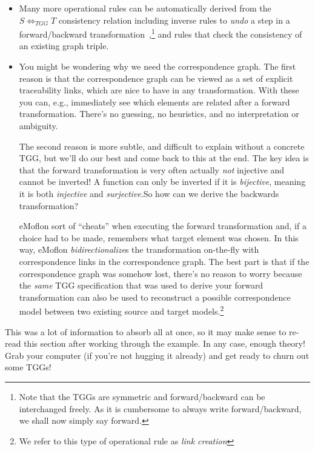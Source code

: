 \begin{itemize}

\item Many more operational rules can be automatically derived from the $S \Leftrightarrow_{TGG} T$ consistency relation including inverse rules to \emph{undo}
a step in a forward/backward transformation~\cite{LAVS_ICGT_2012},\footnote{Note that the TGGs are symmetric and forward/backward can be interchanged freely.
As it is cumbersome to always write forward/backward, we shall now simply say forward.} and rules that check the consistency of an existing graph triple.

\item You might be wondering why we need the correspondence graph. The first reason is that the correspondence graph can be viewed as a set of explicit
traceability links, which are nice to have in any transformation. With these you can, e.g., immediately see which elements are related after a forward
transformation. There's no guessing, no heuristics, and no interpretation or ambiguity.

\vspace{0.25cm}

The second reason is more subtle, and difficult to explain without a concrete TGG, but we'll do our best and come back to this at the end. The
key idea is that the forward transformation is very often actually \emph{not} injective and cannot be inverted! A function
can only be inverted if it is \emph{bijective}, meaning it is both \emph{injective} and \emph{surjective}.So how can we derive the backwards
transformation?

\vspace{0.25cm}

eMoflon sort of ``cheats'' when executing the forward transformation and, if a choice had to be made, remembers what target element was chosen. In this way,
eMoflon \emph{bidirectionalize}s the transformation on-the-fly with correspondence links in the correspondence graph. The best part is that if the
correspondence graph was somehow lost, there's no reason to worry because the \emph{same} TGG specification that was used to derive your forward transformation
can also be used to reconstruct a possible correspondence model between two existing source and target models.\footnote{We refer to this type of operational
rule as \emph{link creation}}

\end{itemize}
This was a lot of information to absorb all at once, so it may make sense to re-read this section after working through the example. In any case, enough theory!
Grab your computer (if you're not hugging it already) and get ready to churn out some TGGs!
